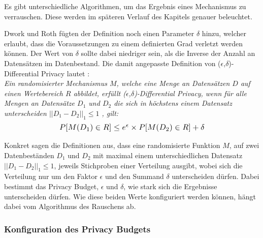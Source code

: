 Es gibt unterschiedliche Algorithmen, um das Ergebnis eines Mechanismus zu verrauschen.
Diese werden im späteren Verlauf des Kapitels genauer beleuchtet.

Dwork und Roth \cite{P-27} fügten der Definition noch einen Parameter $\delta$ hinzu, welcher erlaubt, dass die Voraussetzungen zu einem definierten Grad verletzt werden können.
Der Wert von $\delta$ sollte dabei niedriger sein, als die Inverse der Anzahl an Datensätzen im Datenbestand.
Die damit angepasste Definition von ($\epsilon$,$\delta$)-Differential Privacy lautet \cite{P-27}:\\
\textit{
Ein randomisierter Mechanismus $M$, welche eine Menge an Datensätzen $D$ auf einen Wertebereich $R$ abbildet, erfüllt ($\epsilon$,$\delta$)-Differential Privacy, wenn für alle Mengen an Datensätze $D_{1}$ und $D_{2}$ die sich in höchstens einem Datensatz unterscheiden $||D_{1} - D_{2}||_{1} \leq 1$ , gilt:}
\begin{equation}
\resizebox{!}{0.3cm}{$
    P[M(D_{1}) \in R] \leq e^{\epsilon} \times P[M(D_{2}) \in R] + \delta
$}
\end{equation} 

Konkret sagen die Definitionen aus, dass eine randomisierte Funktion $M$, auf zwei Datenbeständen $D_{1}$ und $D_{2}$ mit maximal einem unterschiedlichen Datensatz $||D_{1} - D_{2}||_{1} \leq 1$, jeweils Stichproben einer Verteilung ausgibt, wobei sich die Verteilung nur um den Faktor $\epsilon$ und den Summand $\delta$ unterscheiden dürfen.
Dabei bestimmt das Privacy Budget, $\epsilon$ und $\delta$, wie stark sich die Ergebnisse unterscheiden dürfen.
Wie diese beiden Werte konfiguriert werden können, hängt dabei vom Algorithmus des Rauschens ab.

\subsubsection*{Konfiguration des Privacy Budgets}

